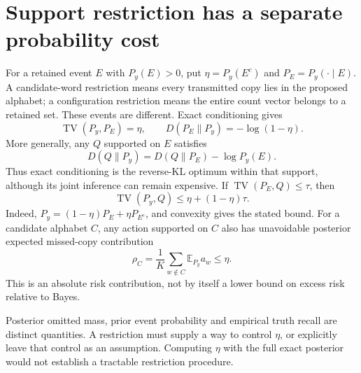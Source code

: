 \documentclass[10pt,a4paper]{article}
\newcommand{\E}{\mathbb E}
\newcommand{\TV}{\operatorname{TV}}
\begin{document}
\clearpage
\section{Support restriction has a separate probability cost}
\label{sec:restriction-foundation}
For a retained event $E$ with $P_y(E)>0$, put $\eta=P_y(E^c)$ and $P_E=P_y(\cdot\mid E)$.
A candidate-word restriction means every transmitted copy lies in the proposed alphabet; a configuration
restriction means the entire count vector belongs to a retained set. These events are different.
Exact conditioning gives
\begin{equation}
 \TV(P_y,P_E)=\eta,\qquad D(P_E\|P_y)=-\log(1-\eta).
 \label{eq:restriction}
\end{equation}
More generally, any $Q$ supported on $E$ satisfies
\[
 D(Q\|P_y)=D(Q\|P_E)-\log P_y(E).
\]
Thus exact conditioning is the reverse-KL optimum within that support, although its joint inference can
remain expensive. If $\TV(P_E,Q)\leq\tau$, then
\begin{equation}
 \TV(P_y,Q)\leq\eta+(1-\eta)\tau.
 \label{eq:restriction-plus}
\end{equation}
Indeed, $P_y=(1-\eta)P_E+\eta P_{E^c}$, and convexity gives the stated bound. For a candidate alphabet $C$,
any action supported on $C$ also has unavoidable posterior expected missed-copy contribution
\[
 \rho_C=\frac1K\sum_{w\notin C}\E_{P_y}a_w\leq\eta.
\]
This is an absolute risk contribution, not by itself a lower bound on excess risk relative to Bayes.

Posterior omitted mass, prior event probability and empirical truth recall are distinct quantities. A
restriction must supply a way to control $\eta$, or explicitly leave that control as an assumption. Computing
$\eta$ with the full exact posterior would not establish a tractable restriction procedure.
\end{document}
